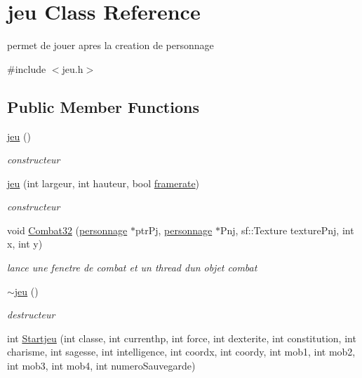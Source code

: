 \hypertarget{classjeu}{}\section{jeu Class Reference}
\label{classjeu}


permet de jouer apres la creation de personnage  




{\ttfamily \#include $<$jeu.\+h$>$}

\subsection*{Public Member Functions}
\begin{DoxyCompactItemize}
\item 
\mbox{\hyperlink{classjeu_a38513a7bfd0a7ea4e3a5612da2856016}{jeu}} ()
\begin{DoxyCompactList}\small\item\em constructeur \end{DoxyCompactList}\item 
\mbox{\hyperlink{classjeu_a2f669239f8bb86c9cac7fadacfc52095}{jeu}} (int largeur, int hauteur, bool \mbox{\hyperlink{classjeu_a6a6fdfc55acc0b08ea2c7f9874060f58}{framerate}})
\begin{DoxyCompactList}\small\item\em constructeur \end{DoxyCompactList}\item 
void \mbox{\hyperlink{classjeu_a63596fcd7c1a89fa40d5f5d89a159828}{Combat32}} (\mbox{\hyperlink{classpersonnage}{personnage}} $\ast$ptr\+Pj, \mbox{\hyperlink{classpersonnage}{personnage}} $\ast$Pnj, sf\+::\+Texture texture\+Pnj, int x, int y)
\begin{DoxyCompactList}\small\item\em lance une fenetre de combat et un thread d\textquotesingle{}un objet combat \end{DoxyCompactList}\item 
\mbox{\hyperlink{classjeu_a55385a33ef40e0579eb3a3634566c4a8}{$\sim$jeu}} ()
\begin{DoxyCompactList}\small\item\em destructeur \end{DoxyCompactList}\item 
int \mbox{\hyperlink{classjeu_aeb59c51913d23e2f449ad04f0de2072b}{Startjeu}} (int classe, int currenthp, int force, int dexterite, int constitution, int charisme, int sagesse, int intelligence, int coordx, int coordy, int mob1, int mob2, int mob3, int mob4, int numero\+Sauvegarde)

\end{DoxyCompactItemize}
